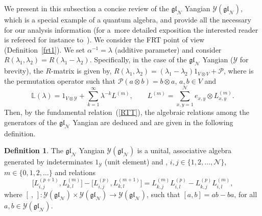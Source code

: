 \documentclass[pdftex]{sigma}
\numberwithin{equation}{section}
\theoremstyle{definition}
\newtheorem{defn}[thm]{Definition}
\begin{document}
We present in this subsection a concise review of the $\mathfrak{gl}_{\mathcal N}$ Yangian
${\mathcal Y}(\mathfrak{gl}_{\mathcal N})$, which is a special example of a quantum algebra, and provide all the necessary for our analysis information (for a~more detailed exposition the interested reader is refereed for instance to~\cite{Chari, Molev}). We consider the FRT point of view (Definition~\ref{frt1}). We set $\alpha^{-1}=\lambda$ (additive parameter) and consider~${R(\lambda_1, \lambda_2)= R(\lambda_1 - \lambda_2)}$. Specifically, in the case of the $\mathfrak{gl}_{\mathcal N}$ Yangian (${\mathcal Y}$ for brevity), the $R$-matrix is given by, $R(\lambda_1, \lambda_2) = (\lambda_1 - \lambda_2) 1_{V \otimes V} + {\mathcal P}$, where  is the permutation operator such that ${\mathcal P}(a\otimes b) = b \otimes a$, $a,b \in V$ and
\[
{\mathbb L}(\lambda) = 1_{V \otimes {\mathcal Y}} + \sum_{k=1}^{\infty} \lambda^{-k} L^{(m)}, \qquad
L^{(m)} = \sum_{x,y=1}^{\mathcal N} e_{x,y} \otimes L_{x,y}^{(m)}.
\]
 Then, by the fundamental relation~(\ref{RTT}), the algebraic relations among the generators  of the $\mathfrak{gl}_{\mathcal N}$ Yangian are deduced and are given in the following definition.
\begin{defn}
The $\mathfrak{gl}_{\mathcal N}$ Yangian ${\mathcal Y}(\mathfrak{gl}_{\mathcal N})$ is a unital, associative algebra generated by indetermi\-nates $1_{\mathcal Y}$ (unit element) and , $i,j \in \{1,2,\dots,{\mathcal N}\}$, $m \in \{0,1,2,\dots\}$ and relations
\begin{equation}
\bigl[ L_{i,j}^{(p+1)}, L_{k,l}^{(m)}\bigr] -\bigl[ L_{i,j}^{(p)}, L_{k,l}^{(m+1)}\bigr] = L_{k,j}^{(m)}L_{i,l}^{(p)}- L_{k,j}^{(p)}L_{i,l}^{(m)}, \label{fund2b}
\end{equation}
where $[ \ ,\, ]\colon {\mathcal Y}(\mathfrak{gl}_{\mathcal N})\times {\mathcal Y}(\mathfrak{gl}_{\mathcal N})\to {\mathcal Y}(\mathfrak{gl}_{\mathcal N})$, such that $[a, b] = ab - ba$, for all $a,b \in {\mathcal Y}(\mathfrak{gl}_{\mathcal N})$.
\end{defn}
\end{document}
